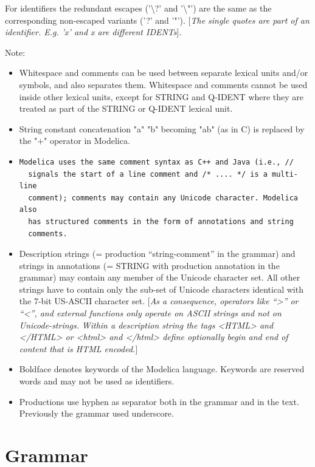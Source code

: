 \documentclass[10pt,a4paper]{report}
\def\doublelabel#1{\label{#1}\hypertarget{#1}{}}
\begin{document}
For identifiers the redundant escapes ('\textbackslash{}?' and
'\textbackslash{}"') are the same as the corresponding non-escaped
variants ('?' and '"'). {[}\emph{The single quotes are part of an
identifier. E.g. 'x' and x are different IDENTs}{]}.

Note:

\begin{itemize}
\item
  Whitespace and comments can be used between separate lexical units
  and/or symbols, and also separates them. Whitespace and comments
  cannot be used inside other lexical units, except for STRING and
  Q-IDENT where they are treated as part of the STRING or Q-IDENT
  lexical unit.
\item
  String constant concatenation "a" "b" becoming "ab" (as in C) is
  replaced by the "+" operator in Modelica.
\item
\begin{lstlisting}[language=modelica]
  Modelica uses the same comment syntax as C++ and Java (i.e., //
  signals the start of a line comment and /* .... */ is a multi-line
  comment); comments may contain any Unicode character. Modelica also
  has structured comments in the form of annotations and string
  comments.
\end{lstlisting}
\item
  Description strings (= production ``string-comment'' in the grammar)
  and strings in annotations (= STRING with production annotation in the
  grammar) may contain any member of the Unicode character set. All
  other strings have to contain only the sub-set of Unicode characters
  identical with the 7-bit US-ASCII character set. {[}\emph{As a
  consequence, operators like ``\textgreater{}'' or ``\textless{}'', and
  external functions only operate on ASCII strings and not on
  Unicode-strings.} \emph{Within a description string the tags
  \textless{}HTML\textgreater{} and \textless{}/HTML\textgreater{} or
  \textless{}html\textgreater{} and \textless{}/html\textgreater{}
  define optionally begin and end of content that is HTML encoded.}{]}
\item
  Boldface denotes keywords of the Modelica language. Keywords are
  reserved words and may not be used as identifiers.
\item
  Productions use hyphen as separator both in the grammar and in the
  text. Previously the grammar used underscore.
\end{itemize}

\section{Grammar}\doublelabel{grammar}
\end{document}
